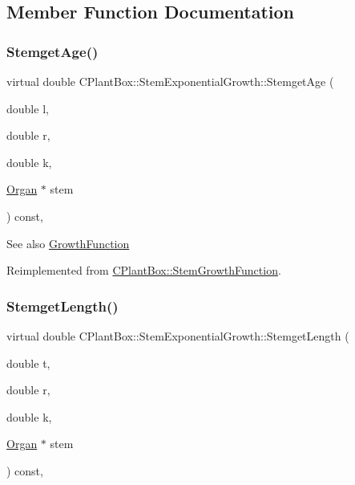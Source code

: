 \subsection{Member Function Documentation}
\mbox{\label{classCPlantBox_1_1StemExponentialGrowth_a72f33a3ca13bddc934810dbe3d7b7652}} 
\subsubsection{\texorpdfstring{Stemget\+Age()}{StemgetAge()}}
{\footnotesize\ttfamily virtual double C\+Plant\+Box\+::\+Stem\+Exponential\+Growth\+::\+Stemget\+Age (\begin{DoxyParamCaption}\item[{double}]{l,  }\item[{double}]{r,  }\item[{double}]{k,  }\item[{\hyperlink{classCPlantBox_1_1Organ}{Organ} $\ast$}]{stem }\end{DoxyParamCaption}) const\hspace{0.3cm}{\ttfamily [inline]}, {\ttfamily [virtual]}}

\begin{DoxySeeAlso}{See also}
\hyperlink{classCPlantBox_1_1GrowthFunction}{Growth\+Function} 
\end{DoxySeeAlso}


Reimplemented from \hyperlink{classCPlantBox_1_1StemGrowthFunction_a94c113c8b153e2cd7f3827f718024992}{C\+Plant\+Box\+::\+Stem\+Growth\+Function}.

\mbox{\label{classCPlantBox_1_1StemExponentialGrowth_a979dabd31e15e4d4a014b5477301d29c}} 
\subsubsection{\texorpdfstring{Stemget\+Length()}{StemgetLength()}}
{\footnotesize\ttfamily virtual double C\+Plant\+Box\+::\+Stem\+Exponential\+Growth\+::\+Stemget\+Length (\begin{DoxyParamCaption}\item[{double}]{t,  }\item[{double}]{r,  }\item[{double}]{k,  }\item[{\hyperlink{classCPlantBox_1_1Organ}{Organ} $\ast$}]{stem }\end{DoxyParamCaption}) const\hspace{0.3cm}{\ttfamily [inline]}, {\ttfamily [virtual]}}


